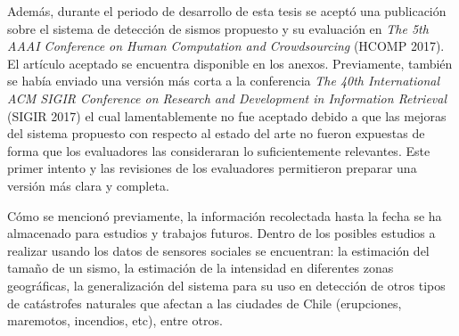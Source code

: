 \begin{conclusion}
Además, durante el periodo de desarrollo de esta tesis se aceptó una publicación sobre el sistema de detección de sismos propuesto y su evaluación en \textit{The 5th AAAI Conference on Human Computation and Crowdsourcing} (HCOMP 2017). El artículo aceptado se encuentra disponible en los anexos. Previamente, también se había enviado una versión más corta a la conferencia \textit{The 40th International ACM SIGIR Conference on Research and Development in Information Retrieval} (SIGIR 2017) el cual lamentablemente no fue aceptado debido a que las mejoras del sistema propuesto con respecto al estado del arte no fueron expuestas de forma que los evaluadores las consideraran lo suficientemente relevantes. Este primer intento y las revisiones de los evaluadores permitieron preparar una versión más clara y completa.

Cómo se mencionó previamente, la información recolectada hasta la fecha se ha almacenado para estudios y trabajos futuros. Dentro de los posibles estudios a realizar usando los datos de sensores sociales se encuentran: la estimación del tamaño de un sismo, la estimación de la intensidad en diferentes zonas geográficas, la generalización del sistema para su uso en detección de otros tipos de catástrofes naturales que afectan a las ciudades de Chile (erupciones, maremotos, incendios, etc), entre otros.

\end{conclusion}


